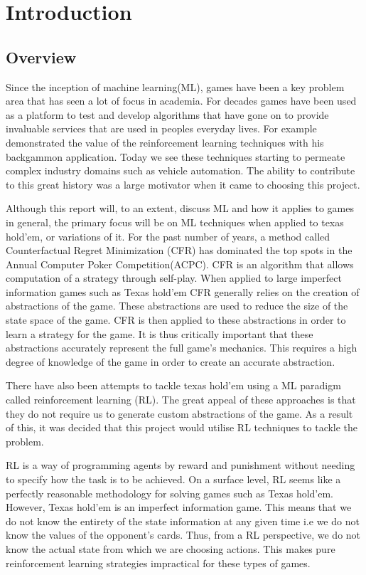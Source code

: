 \chapter{Introduction}
\label{ch:intro}

\section{Overview}\label{sec:overview}
Since the inception of machine learning(ML), games have been a key problem area that has seen a lot of focus
in academia.
For decades games have been used as a platform to test and develop algorithms that have gone on to provide invaluable
services that are used in peoples everyday lives.
For example\citep{tesauro1995td} demonstrated the value of the reinforcement learning techniques
with his backgammon application.
Today we see these techniques starting to permeate complex industry domains such as vehicle
automation\citep{desjardins2011cooperative}.
The ability to contribute to this great history was a large motivator when it came to choosing this project.

Although this report will, to an extent, discuss ML and how it applies to games in general, the primary
focus will be on ML techniques when applied to texas hold'em, or variations of it.
For the past number of years, a method called Counterfactual Regret Minimization (CFR) has dominated the
top spots in the Annual Computer Poker Competition(ACPC).
CFR is an algorithm that allows computation of a strategy through self-play.
When applied to large imperfect information games such as Texas hold'em CFR generally relies on the creation of abstractions of the game.
These abstractions are used to reduce the size of the state space of the game.
CFR is then applied to these abstractions in order to learn a strategy for the game.
It is thus critically important that these abstractions accurately represent the full game's mechanics.
This requires a high degree of knowledge of the game in order to create an accurate abstraction.

There have also been attempts to tackle texas hold'em using a ML paradigm called reinforcement
learning (RL).
The great appeal of these approaches is that they do not require us to generate custom abstractions of the game.
As a result of this, it was decided that this project would utilise RL techniques to tackle the problem.

RL is a way of programming agents by reward and punishment without needing to specify how the
task is to be achieved\citep{kaelbling1996reinforcement}.
On a surface level, RL seems like a perfectly reasonable methodology for solving games such as Texas hold'em.
However, Texas hold'em is an imperfect information game.
This means that we do not know the entirety of the state information at any given time
i.e we do not know the values of the opponent's cards.
Thus, from a RL perspective, we do not know the actual state from which we are choosing actions.
This makes pure reinforcement learning strategies impractical for these types of games.

